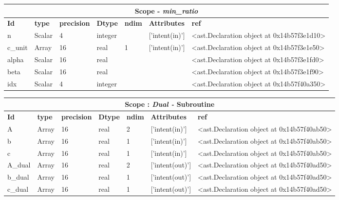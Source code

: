 \documentclass{report}
\begin{document}
\begin{center}
\begin{longtable}{|p{3.5cm}|p{1.5cm}|p{1.5cm}|p{1.5cm}|p{1cm}|p{2cm}|p{4cm}| }
\hline
\multicolumn{7}{|c|}{\textbf{Scope} -  \textbf{\textit{min\_ratio}}} \\ 
\hline
\textbf{Id} & \textbf{type} & \textbf{precision} & \textbf{Dtype} & \textbf{ndim} & \textbf{Attributes} & \textbf{ref} \\\hline

n & Scalar & 4 & integer &  & ['intent(in)'] & <ast.Declaration object at 0x14b57f3e1d10> \\\hline

c\_unit & Array & 16 & real & 1 & ['intent(in)'] & <ast.Declaration object at 0x14b57f3e1e50> \\\hline

alpha & Scalar & 16 & real &  &  & <ast.Declaration object at 0x14b57f3e1fd0> \\\hline

beta & Scalar & 16 & real &  &  & <ast.Declaration object at 0x14b57f3e1f90> \\\hline

idx & Scalar & 4 & integer &  &  & <ast.Declaration object at 0x14b57f40a350> \\\hline

\end{longtable}
\end{center}

 \vspace{1cm}

\begin{center}
\begin{longtable}{|p{3.5cm}|p{1.5cm}|p{1.5cm}|p{1.5cm}|p{1cm}|p{2cm}|p{4cm}| }
\hline
\multicolumn{7}{|c|}{\textbf{Scope : \qquad}  \textbf{\textit{Dual - }Subroutine}}\\ 
\hline
\textbf{Id} & \textbf{type} & \textbf{precision} & \textbf{Dtype} & \textbf{ndim} & \textbf{Attributes} & \textbf{ref} \\\hline

A & Array & 16 & real & 2 & ['intent(in)'] & <ast.Declaration object at 0x14b57f40ab50> \\\hline

b & Array & 16 & real & 1 & ['intent(in)'] & <ast.Declaration object at 0x14b57f40ab50> \\\hline

c & Array & 16 & real & 1 & ['intent(in)'] & <ast.Declaration object at 0x14b57f40ab50> \\\hline

A\_dual & Array & 16 & real & 2 & ['intent(out)'] & <ast.Declaration object at 0x14b57f40ad50> \\\hline

b\_dual & Array & 16 & real & 1 & ['intent(out)'] & <ast.Declaration object at 0x14b57f40ad50> \\\hline

c\_dual & Array & 16 & real & 1 & ['intent(out)'] & <ast.Declaration object at 0x14b57f40ad50> \\\hline

\end{longtable}
\end{center}
\end{document}
